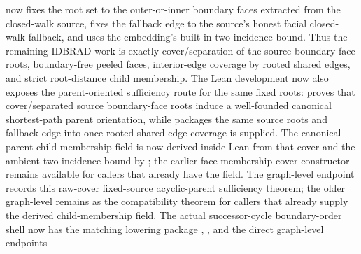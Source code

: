 \documentclass[11pt]{article}
\begin{document}
now fixes the root set to the outer-or-inner boundary faces extracted from the
closed-walk source, fixes the fallback edge to the source's honest facial
closed-walk fallback, and uses the embedding's built-in two-incidence bound.
Thus the remaining IDBRAD work is exactly cover/separation of the source
boundary-face roots, boundary-free peeled faces, interior-edge coverage by
rooted shared edges, and strict root-distance child membership.  The Lean
development now also exposes the parent-oriented sufficiency route for the
same fixed roots:
proves that cover/separated source boundary-face roots induce a well-founded
canonical shortest-path parent orientation, while
packages the same source roots and fallback edge into
 once rooted shared-edge coverage
is supplied.  The canonical parent child-membership field is now derived inside
Lean from that cover and the ambient two-incidence bound by
; the earlier
face-membership-cover constructor remains available for callers that already
have the field.  The graph-level endpoint
records this raw-cover fixed-source acyclic-parent sufficiency theorem; the
older graph-level
remains as the compatibility theorem for callers that already supply the
derived child-membership field.  The actual successor-cycle boundary-order
shell now has the matching lowering package
,
,
and the direct graph-level endpoints
\end{document}
